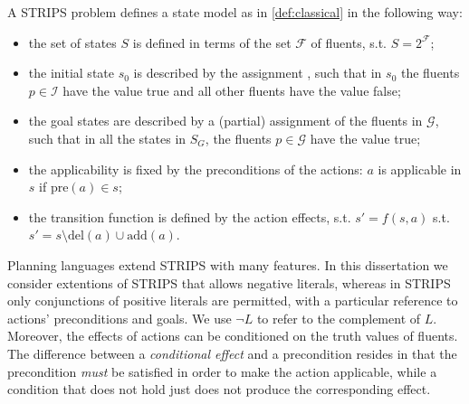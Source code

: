 A STRIPS problem defines a state model as in \autoref{def:classical}
 in the following way:
\begin{itemize}
 \item the set of  states $S$ is defined in terms of the set $\mathcal{F}$ of fluents,
  s.t. $S = 2^\mathcal{F}$;
 \item the initial state $s_0$ is described by the assignment \init, 
       such that in $s_0$ the fluents $p \in \mathcal{I}$
 have the value true and all other fluents have the value false;
 \item the goal states are described by a (partial) assignment of the fluents in $\mathcal{G}$,
   such that in all the states in $S_G$,  the fluents $p \in \mathcal{G}$ 
   have the value true;
 \item the applicability is fixed by the preconditions of the actions: 
       $a$ is applicable in $s$ if $\text{pre}(a) \in s$;
 \item the transition function is defined by the action effects, s.t.
       $s' = f(s,a)$ s.t. $s' = s\setminus \text{del}(a) \cup \text{add}(a)$.
\end{itemize}

Planning languages extend  STRIPS with many features.
%
In this dissertation we consider extentions of STRIPS that allows negative literals, whereas in STRIPS only conjunctions of positive literals are permitted,
with a particular reference to actions' preconditions and goals. 
We  use $\neg L$ to refer to the complement of  $L$.
Moreover, the effects of actions can be conditioned on the
truth values of fluents.  
The difference between a \emph{conditional effect} and a precondition resides in that the precondition
\emph{must} be satisfied in order to make the action applicable, while
a condition that does not hold just does not produce the corresponding
effect. %

